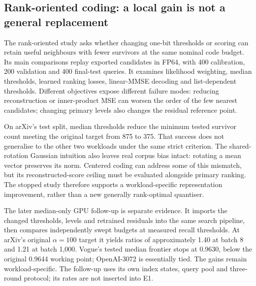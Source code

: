 \subsection{Rank-oriented coding: a local gain is not a general replacement}
\label{sec:8-rank}

The rank-oriented study asks whether changing one-bit thresholds or scoring
can retain useful neighbours with fewer survivors at the same nominal code
budget. Its main comparisons replay exported candidates in FP64, with
400 calibration, 200 validation and 400 final-test queries. It examines
likelihood weighting, median thresholds, learned ranking losses,
linear-MMSE decoding and list-dependent thresholds. Different objectives
expose different failure modes: reducing reconstruction or inner-product
MSE can worsen the order of the few nearest candidates; changing primary
levels also changes the residual reference point.

On arXiv's test split, median thresholds reduce the minimum tested survivor
count meeting the original target from 875 to 375. That success does not
generalise to the other two workloads under the same strict criterion.
The shared-rotation Gaussian intuition also leaves real corpus bias intact:
rotating a mean vector preserves its norm. Centered coding can address some
of this mismatch, but its reconstructed-score ceiling must be evaluated
alongside primary ranking. The stopped study therefore supports a
workload-specific representation improvement, rather than a new generally
rank-optimal quantiser.

The later median-only GPU follow-up is separate evidence. It imports the
changed thresholds, levels and retrained residuals into the same search
pipeline, then compares independently swept budgets at measured recall
thresholds. At arXiv's original $\alpha=100$ target it yields ratios of
approximately 1.40 at batch 8 and 1.21 at batch 1,000. Vogue's tested median
frontier stops at 0.9630, below the original 0.9644 working point;
OpenAI-3072 is essentially tied. The gains remain workload-specific. The follow-up uses its own index states, query pool and
three-round protocol; its rates are not inserted into E1.
